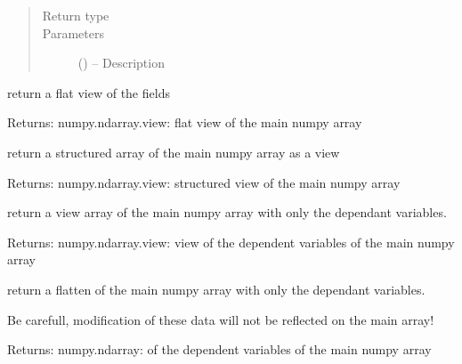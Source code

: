 \documentclass[letterpaper,10pt,english]{sphinxmanual}
\begin{document}
\begin{fulllineitems}
\begin{fulllineitems}
\begin{quote}
\begin{description}
\item[{Return type}] \leavevmode
{}

\item[{Parameters}] \leavevmode
{} () -- Description

\end{description}\end{quote}

\end{fulllineitems}


\begin{fulllineitems}
\label{\detokenize{triflow.core:triflow.core.fields.BaseFields.flat}}
return a flat view of the fields

Returns: numpy.ndarray.view: flat view of the main numpy array

\end{fulllineitems}


\begin{fulllineitems}
\label{\detokenize{triflow.core:triflow.core.fields.BaseFields.structured}}
return a structured array of the main numpy array as a view

Returns: numpy.ndarray.view: structured view of the main numpy array

\end{fulllineitems}


\begin{fulllineitems}
\label{\detokenize{triflow.core:triflow.core.fields.BaseFields.uarray}}
return a view array of the main numpy array with only the
dependant variables.

Returns: numpy.ndarray.view: view of the dependent variables of the main numpy array

\end{fulllineitems}


\begin{fulllineitems}
\label{\detokenize{triflow.core:triflow.core.fields.BaseFields.uflat}}
return a flatten  of the main numpy array with only the
dependant variables.

Be carefull, modification of these data will not be reflected on
the main array!

Returns: numpy.ndarray:  of the dependent variables of the main numpy array

\end{fulllineitems}


\end{fulllineitems}
\end{document}
